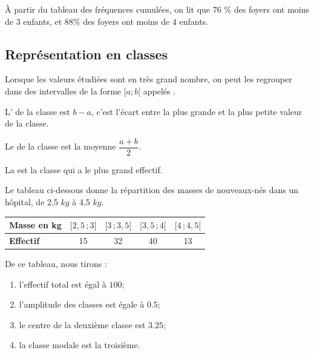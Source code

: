  À partir du tableau des fréquences cumulées, on lit que \( 76\) \% des foyers ont moins de 3 enfants, et \( 88\)\% des foyers ont moins de 4 enfants.

\subsection{Représentation en classes}

Lorsque les valeurs étudiées sont en très grand nombre, on peut les
regrouper dans des intervalles de la forme $[a;b[$ appelés
    . 

    L' de la classe est $b-a$, c'est l'écart entre la plus
grande et la plus petite valeur de la classe.

Le  de la classe est la moyenne $\dfrac{a+b}2$.

La  est la classe qui a le plus grand effectif. 

\medskip

\begin{example}
Le tableau ci-dessous donne la répartition des masses de nouveaux-nés dans un hôpital, de 2,5 $kg$ à 4,5 $kg$.


\begin{center}
  \begin{tabular}[h]{|l|c|c|c|c|}
    \hline
    \textbf{Masse en kg} & $[2,\!5\,;3[$ & $[3\,;3,\!5[$ & $[3,\!5\,;4[$ &
    $[4\,;4,\!5[$ \\
    \hline
    \textbf{Effectif} & 15 & 32 & 40 & 13 \\
    \hline
  \end{tabular}
    
\end{center}
  
De ce tableau, nous tirons :
\begin{enumerate}
    \item
  l'effectif total est égal à \( 100\);
  \item
  l'amplitude des classes est égale à \( 0.5\);
  \item
  le centre de la deuxième classe est \( 3.25\);
  \item
  la classe modale est la troisième.
\end{enumerate}


    
\end{example}



